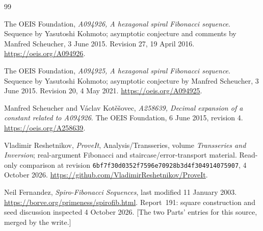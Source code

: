 \documentclass[11pt]{article}
\theoremstyle{remark}\newtheorem{remark}[theorem]{Remark}
\begin{document}
\clearpage
\begin{thebibliography}{99}
\small
\raggedright
{}
The OEIS Foundation, \emph{A094926, A hexagonal spiral Fibonacci sequence}. Sequence by Yasutoshi Kohmoto; asymptotic conjecture and comments by Manfred Scheucher, 3 June 2015. Revision 27, 19 April 2016.
\url{https://oeis.org/A094926}.

The OEIS Foundation, \emph{A094925, A hexagonal spiral Fibonacci sequence}. Sequence by Yasutoshi Kohmoto; asymptotic conjecture by Manfred Scheucher, 3 June 2015. Revision 20, 4 May 2021.
\url{https://oeis.org/A094925}.

Manfred Scheucher and V\'aclav Kot\v e\v sovec, \emph{A258639, Decimal expansion of a constant related to A094926}. The OEIS Foundation, 6 June 2015, revision 4.
\url{https://oeis.org/A258639}.

Vladimir Reshetnikov, \emph{ProveIt}, Analysis/Transseries, volume \emph{Transseries and Inversion}; real-argument Fibonacci and staircase/error-transport material. Read-only comparison at revision \texttt{6bf7f30d0352f7596e70928b3d4f304914075907}, 4 October 2026.
\url{https://github.com/VladimirReshetnikov/ProveIt}.

Neil Fernandez, \emph{Spiro-Fibonacci Sequences}, last modified 11 January 2003.
\url{https://borve.org/primeness/spirofib.html}. Report~191: square construction and seed discussion inspected 4 October 2026. [The two Parts' entries for this source, merged by the write.]


\end{thebibliography}
\end{document}
